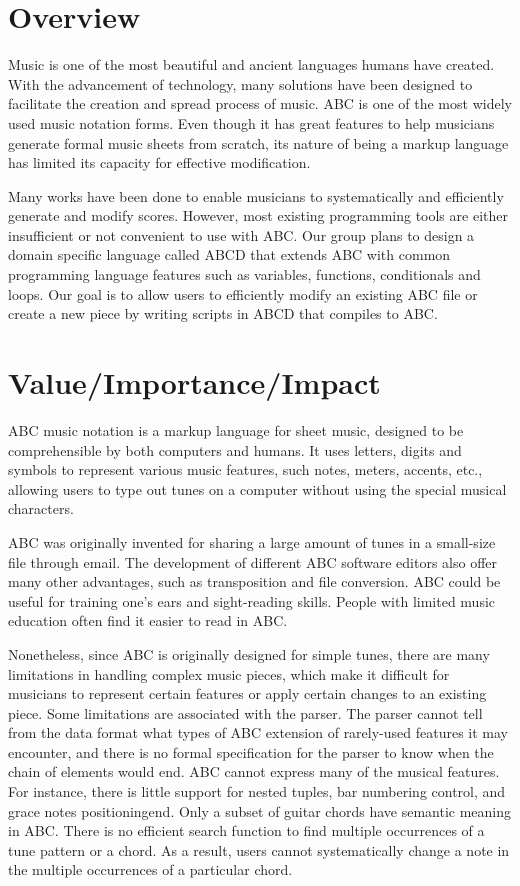 \section{Overview}

Music is one of the most beautiful and ancient languages humans have created. With the advancement of technology, many solutions have been designed to facilitate the creation and spread process of music. ABC is one of the most widely used music notation forms. Even though it has great features to help musicians generate formal music sheets from scratch, its nature of being a markup language has limited its capacity for effective modification.

Many works have been done to enable musicians to systematically and efficiently generate and modify scores. However, most existing programming tools are either insufficient or not convenient to use with ABC. Our group plans to design a domain specific language called ABCD that extends ABC with common programming language features such as variables, functions, conditionals and loops. Our goal is to allow users to efficiently modify an existing ABC file or create a new piece by writing scripts in ABCD that compiles to ABC.

\section{Value/Importance/Impact}

ABC music notation is a markup language for sheet music, designed to be comprehensible by both computers and humans. It uses letters, digits and symbols to represent various music features, such notes, meters, accents, etc., allowing users to type out tunes on a computer without using the special musical characters\cite{Walshaw11}.

ABC was originally invented for sharing a large amount of tunes in a small-size file through email\cite{Johnson17}. The development of different ABC software editors also offer many other advantages, such as transposition and file conversion. ABC could be useful for training one's ears and sight-reading skills. People with limited music education often find it easier to read in ABC\cite{Mary14}. 

Nonetheless, since ABC is originally designed for simple tunes, there are many limitations in handling complex music pieces, which make it difficult for musicians to represent certain features or apply certain changes to an existing piece. Some limitations are associated with the parser. The parser cannot tell from the data format what types of ABC extension of rarely-used features it may encounter, and there is no formal specification for the parser to know when the chain of elements would end\cite{Cuthbert14}. ABC cannot express many of the musical features. For instance, there is little support for nested tuples, bar numbering control, and grace notes positioningend\cite{Cuthbert14}. Only a subset of guitar chords have semantic meaning in ABC\cite{Chambers02}. There is no efficient search function to find multiple occurrences of a tune pattern or a chord. As a result, users cannot systematically change a note in the multiple occurrences of a particular chord. 

